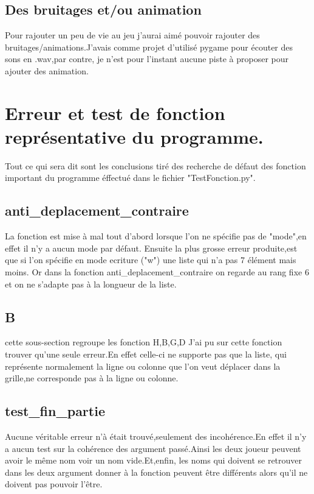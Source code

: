 \documentclass{article}
\begin{document}
\subsection{Des bruitages et/ou animation}
Pour rajouter un peu de vie au jeu j'aurai aimé pouvoir rajouter des bruitages/animations.J'avais comme projet d'utilisé pygame pour écouter des sons en .wav,par contre, je n'est pour l'instant aucune piste à proposer pour ajouter des animation.

\section{Erreur et test de fonction représentative du programme.}
Tout ce qui sera dit sont les conclusions tiré des recherche de défaut des fonction important du programme éffectué dans le fichier "TestFonction.py".
\vspace{0.5cm}


\subsection{anti\_deplacement\_contraire}
La fonction est mise à mal tout d'abord lorsque l'on ne spécifie pas de "mode",en effet il n'y a aucun mode par défaut.
Ensuite la plus grosse erreur produite,est que si l'on spécifie en mode ecriture ("w") une liste qui n'a pas 7 élément mais moins. Or dans la fonction anti\_deplacement\_contraire on regarde au rang fixe 6 et on ne s'adapte pas à la longueur de la liste.
\subsection{B}
cette sous-section regroupe les fonction H,B,G,D
J'ai pu sur cette fonction trouver qu'une seule erreur.En effet celle-ci ne supporte pas que la liste, qui représente normalement la ligne ou colonne que l'on veut déplacer dans la grille,ne corresponde pas à la ligne ou colonne.

\subsection{test\_fin\_partie}
Aucune véritable erreur n'à était trouvé,seulement des incohérence.En effet il n'y a aucun test sur la cohérence des argument passé.Ainsi les deux joueur peuvent avoir le même nom voir un nom vide.Et,enfin, les noms qui doivent se retrouver dans les deux argument donner à la fonction peuvent être différents alors qu'il ne doivent pas pouvoir l'être.
\end{document}
